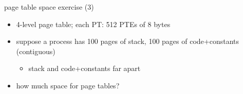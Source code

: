 \begin{frame}{page table space exercise (3)}
\begin{itemize}
\item 4-level page table; each PT: 512 PTEs of 8 bytes
\item suppose a process has 100 pages of stack, 100 pages of code+constants (contiguous)
    \begin{itemize}\item stack and code+constants far apart\end{itemize}
\item how much space for page tables? 
\iftoggle{heldback}{}{
    \item<2-> 1 shared first-level PT, with two valid entries
    \item<2-> two second-level PT, each with one valid entry
    \item<2-> two third-level PT, each with one valid entry
    \item<2-> two fourth-level PT, each with 100 valid entries
}
\end{itemize}
\end{frame}

